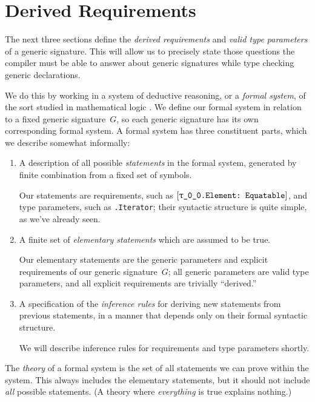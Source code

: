 \documentclass[../generics]{subfiles}
\begin{document}
\section{Derived Requirements}\label{derived req}

The next three sections define the \emph{derived requirements} and \emph{valid type parameters} of a generic signature. This will allow us to precisely state those questions the compiler must be able to answer about generic signatures while type checking generic declarations.

We do this by working in a system of deductive reasoning, or a \emph{formal system}, of the sort studied in mathematical logic \cite{curry}. We define our formal system in relation to a fixed generic signature~$G$, so each generic signature has its own corresponding formal system. A formal system has three constituent parts, which we describe somewhat informally:
\begin{enumerate}
\item A description of all possible \emph{statements} in the formal system, generated by finite combination from a fixed set of symbols.

Our statements are requirements, such as $\ConfReq{\rT.Element}{Equatable}$, and type parameters, such as \texttt{\rU.Iterator}; their syntactic structure is quite simple, as we've already seen.
\item A finite set of \emph{elementary statements} which are assumed to be true.

Our elementary statements are the generic parameters and explicit requirements of our generic signature~$G$; all generic parameters are valid type parameters, and all explicit requirements are trivially ``derived.''

\item A specification of the \emph{inference rules} for deriving new statements from previous statements, in a manner that depends only on their formal syntactic structure.

We will describe inference rules for requirements and type parameters shortly.
\end{enumerate}

The \emph{theory} of a formal system is the set of all statements we can prove within the system. This always includes the elementary statements, but it should not include \emph{all} possible statements. (A theory where \emph{everything} is true explains nothing.)
\end{document}
